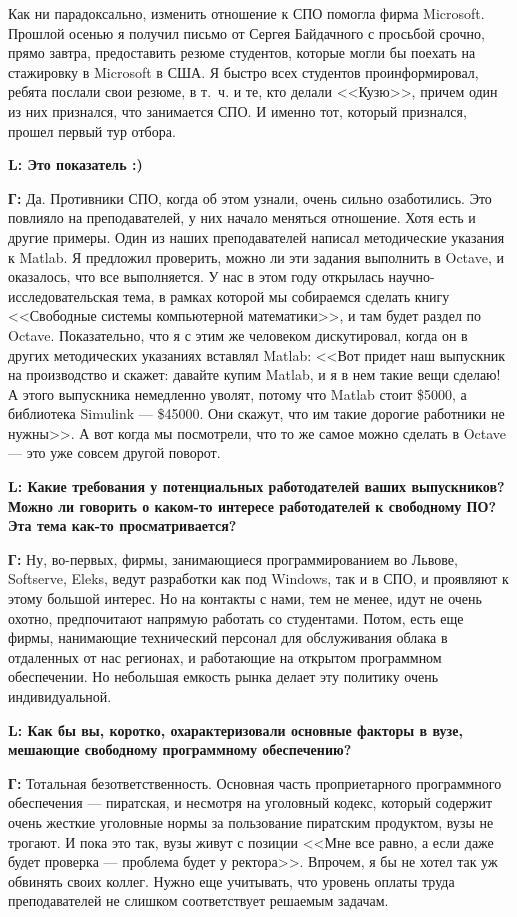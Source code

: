 \documentclass[10pt, a5paper]{article}
\begin{document}
Как ни парадоксально, изменить отношение к СПО помогла фирма Microsoft. Прошлой осенью я получил письмо от Сергея Байдачного с просьбой срочно, прямо завтра, предоставить резюме студентов, которые могли бы поехать на стажировку в Microsoft в США. Я быстро всех студентов проинформировал, ребята послали свои резюме, в т.~ч. и те, кто делали <<Кузю>>, причем один из них признался, что занимается СПО. И именно тот, который признался, прошел первый тур отбора. 

{\noindent \bf L: Это показатель :)}

{\noindent \bf Г:} Да. Противники СПО, когда об этом узнали, очень сильно озаботились. Это повлияло на преподавателей, у них начало меняться отношение. Хотя есть и другие примеры. Один из наших преподавателей написал методические указания к Matlab. Я предложил проверить, можно ли эти задания выполнить в Octave, и оказалось, что все выполняется. У нас в этом году открылась научно-исследовательская тема, в рамках которой мы собираемся сделать книгу <<Свободные системы компьютерной математики>>, и там будет раздел по Octave. Показательно, что я с этим же человеком дискутировал, когда он в других методических указаниях вставлял Matlab: <<Вот придет наш выпускник на производство и скажет: давайте купим Matlab, и я в нем такие вещи сделаю! А этого выпускника немедленно уволят, потому что Matlab стоит \$5000, а библиотека Simulink --- \$45000. Они скажут, что им такие дорогие работники не нужны>>. А вот когда мы посмотрели, что то же самое можно сделать в Octave --- это уже совсем другой поворот.

{\noindent \bf L: Какие требования у потенциальных работодателей ваших выпускников? Можно ли говорить о каком-то интересе работодателей к свободному ПО? Эта тема как-то просматривается?}

{\noindent \bf Г:} Ну, во-первых, фирмы, занимающиеся программированием во Львове, Softserve, Eleks, ведут разработки как под Windows, так и в СПО, и проявляют к этому большой интерес. Но на контакты с нами, тем не менее, идут не очень охотно, предпочитают напрямую работать со студентами. Потом, есть еще фирмы, нанимающие технический персонал для обслуживания облака в отдаленных от нас регионах, и работающие на открытом программном обеспечении. Но небольшая емкость рынка делает эту политику очень индивидуальной.

{\noindent \bf L: Как бы вы, коротко, охарактеризовали основные факторы в вузе, мешающие свободному программному обеспечению?}

{\noindent \bf Г:} Тотальная безответственность. Основная часть проприетарного программного обеспечения --- пиратская, и несмотря на уголовный кодекс, который содержит очень жесткие уголовные нормы за пользование пиратским продуктом, вузы не трогают. И пока это так, вузы живут с позиции <<Мне все равно, а если даже будет проверка --- проблема будет у ректора>>. Впрочем, я бы не хотел так уж обвинять своих коллег. Нужно еще учитывать, что уровень оплаты труда преподавателей не слишком соответствует решаемым задачам.
\end{document}
